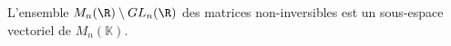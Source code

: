 L'ensemble $M_n(\R) \setminus GL_n(\R)$ des matrices non-inversibles est un sous-espace vectoriel de $M_n(\mathbb{K})$.

\begin{reponses}
\end{reponses}

